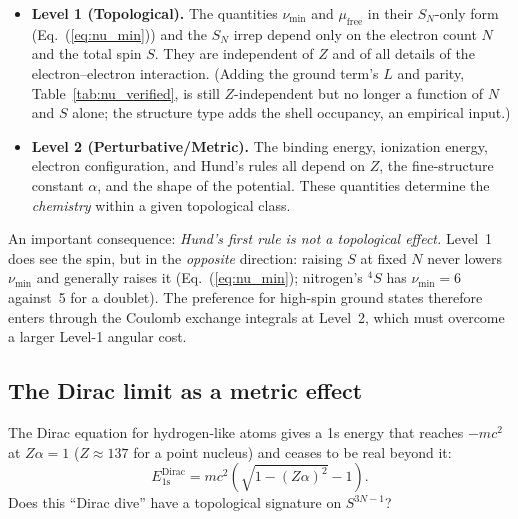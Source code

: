 \documentclass[aps,prl,twocolumn,superscriptaddress,longbibliography]{revtex4-2}
\newcommand{\mufree}{\mu_{\mathrm{free}}}
\begin{document}
\begin{itemize}
  \item \textbf{Level 1 (Topological).}  The quantities
    $\nu_{\min}$ and $\mufree$ in their $S_N$-only form
    (Eq.~(\ref{eq:nu_min})) and the $S_N$ irrep
    depend only on the electron count $N$ and the total spin $S$.
    They are independent of $Z$ and of all details of the
    electron--electron interaction.  (Adding the ground term's $L$
    and parity, Table~\ref{tab:nu_verified}, is still
    $Z$-independent but no longer a function of $N$ and $S$ alone;
    the structure type adds the shell occupancy, an empirical input.)

  \item \textbf{Level 2 (Perturbative/Metric).}  The binding energy,
    ionization energy, electron configuration, and Hund's rules all
    depend on $Z$, the fine-structure constant $\alpha$, and the
    shape of the potential.  These quantities determine the
    \emph{chemistry} within a given topological class.
\end{itemize}

An important consequence: \emph{Hund's first rule is not a topological
effect.}  Level~1 does see the spin, but in the \emph{opposite}
direction: raising $S$ at fixed $N$ never lowers $\nu_{\min}$ and
generally raises it (Eq.~(\ref{eq:nu_min}); nitrogen's ${}^4S$ has
$\nu_{\min} = 6$ against~5 for a doublet).  The preference for
high-spin ground states therefore enters through the Coulomb exchange
integrals at Level~2, which must overcome a larger Level-1 angular
cost.

\subsection{The Dirac limit as a metric effect}
\label{sec:dirac_limit}

The Dirac equation for hydrogen-like atoms gives a 1s energy that
reaches $-mc^2$ at $Z\alpha = 1$ ($Z \approx 137$ for a point
nucleus) and ceases to be real beyond it:
\begin{equation}
  E_{\mathrm{1s}}^{\mathrm{Dirac}}
    = mc^2 \left(\sqrt{1 - (Z\alpha)^2} - 1\right).
  \label{eq:dirac_1s}
\end{equation}
Does this ``Dirac dive'' have a topological signature on $S^{3N-1}$?
\end{document}
